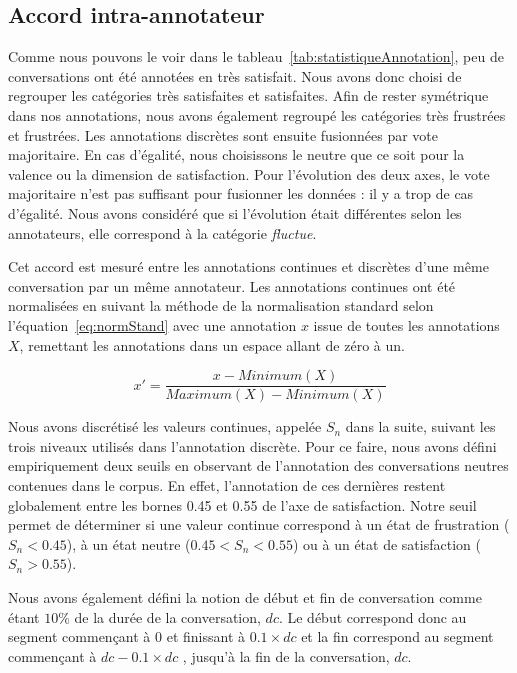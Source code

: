 \subsection{Accord intra-annotateur}
Comme nous pouvons le voir dans le tableau~\ref{tab:statistiqueAnnotation}, peu de conversations ont été annotées en très satisfait. Nous avons donc choisi de regrouper les catégories très satisfaites et satisfaites. Afin de rester symétrique dans nos annotations, nous avons également regroupé les catégories très frustrées et frustrées. Les annotations discrètes sont ensuite fusionnées par vote majoritaire. En cas d'égalité,
nous choisissons le neutre que ce soit pour la valence ou la dimension de satisfaction. Pour l'évolution des deux axes, le vote majoritaire n'est pas suffisant pour fusionner les données : il y a trop de cas d'égalité. Nous avons considéré que si l'évolution était différentes selon les annotateurs, elle correspond à la catégorie \textit{fluctue}.

Cet accord est mesuré entre les annotations continues et discrètes d'une même conversation par un même annotateur. Les annotations continues ont été normalisées en suivant la méthode de la normalisation standard selon l'équation~\ref{eq:normStand} avec une annotation $x$ issue de toutes les annotations $X$, remettant les annotations dans un espace allant de zéro à un.

\begin{equation}
  x' = \frac{x-Minimum(X)}{Maximum(X)-Minimum(X)}
  \label{eq:normStand}
\end{equation}

Nous avons discrétisé les valeurs continues, appelée $S_n$ dans la suite, suivant les trois niveaux utilisés dans l'annotation discrète. Pour ce faire, nous avons défini empiriquement deux seuils en observant de l'annotation des conversations neutres contenues dans le corpus. En effet, l'annotation de ces dernières restent globalement entre les bornes 0.45 et 0.55 de l'axe de satisfaction. Notre seuil permet de déterminer si une valeur continue correspond à un état de frustration ($S_n<0.45$), à un état neutre ($0.45 < S_n < 0.55$) ou à un état de satisfaction ($S_n > 0.55$).

Nous avons également défini la notion de début et fin de conversation comme étant $10\%$ de la durée de la conversation, $dc$.
Le début correspond donc au segment commençant à 0 et finissant à $0.1\times dc$ et la fin correspond au segment commençant à $ dc - 0.1\times dc$ , jusqu'à la fin de la conversation, $dc$.

